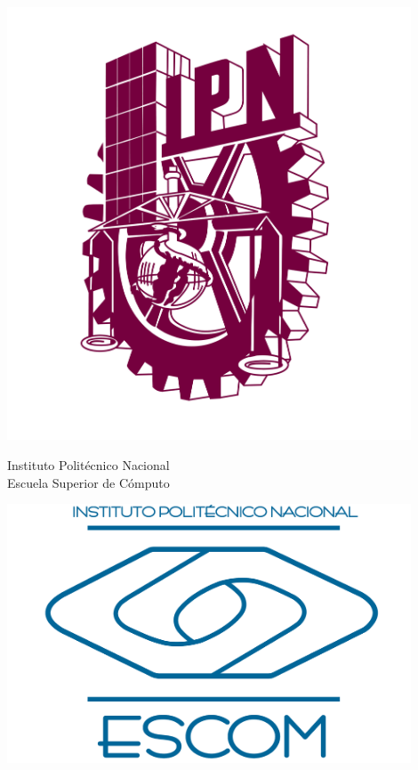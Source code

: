 \documentclass[12pt,twoside]{article}
\date{}
\begin{document}
	
	\begin{center}
		
		\begin{minipage}{0.17\textwidth}
			\flushleft
			\includegraphics[width=0.9\textwidth]{img/ipn_logo.png} %
		\end{minipage}
		\begin{minipage}{.55\textwidth}
			\centering
			{\Large Instituto Politécnico Nacional}\\
			{\Large Escuela Superior de Cómputo}
		\end{minipage}
		\begin{minipage}{0.17\textwidth}
			\flushright
			\includegraphics[width=0.9\textwidth]{img/escom_logo} %
		\end{minipage}			
	\end{center}
	
\end{document}
